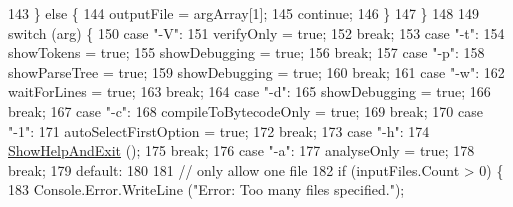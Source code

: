 \begin{DoxyCode}
143                     \} \textcolor{keywordflow}{else} \{
144                         outputFile = argArray[1];
145                         \textcolor{keywordflow}{continue};
146                     \}
147                 \}
148 
149                 \textcolor{keywordflow}{switch} (arg) \{
150                 \textcolor{keywordflow}{case} \textcolor{stringliteral}{"-V"}:
151                     verifyOnly = \textcolor{keyword}{true};
152                     \textcolor{keywordflow}{break};
153                 \textcolor{keywordflow}{case} \textcolor{stringliteral}{"-t"}:
154                     showTokens = \textcolor{keyword}{true};
155                     showDebugging = \textcolor{keyword}{true};
156                     \textcolor{keywordflow}{break};
157                 \textcolor{keywordflow}{case} \textcolor{stringliteral}{"-p"}:
158                     showParseTree = \textcolor{keyword}{true};
159                     showDebugging = \textcolor{keyword}{true};
160                     \textcolor{keywordflow}{break};
161                 \textcolor{keywordflow}{case} \textcolor{stringliteral}{"-w"}:
162                     waitForLines = \textcolor{keyword}{true};
163                     \textcolor{keywordflow}{break};
164                 \textcolor{keywordflow}{case} \textcolor{stringliteral}{"-d"}:
165                     showDebugging = \textcolor{keyword}{true};
166                     \textcolor{keywordflow}{break};
167                 \textcolor{keywordflow}{case} \textcolor{stringliteral}{"-c"}:
168                     compileToBytecodeOnly = \textcolor{keyword}{true};
169                     \textcolor{keywordflow}{break};
170                 \textcolor{keywordflow}{case} \textcolor{stringliteral}{"-1"}:
171                     autoSelectFirstOption = \textcolor{keyword}{true};
172                     \textcolor{keywordflow}{break};
173                 \textcolor{keywordflow}{case} \textcolor{stringliteral}{"-h"}:
174                     \hyperlink{a00106_a0ce7698dabf6d60f3cd33fe5d23c11b3}{ShowHelpAndExit} ();
175                     \textcolor{keywordflow}{break};
176                 \textcolor{keywordflow}{case} \textcolor{stringliteral}{"-a"}:
177                     analyseOnly = \textcolor{keyword}{true};
178                     \textcolor{keywordflow}{break};
179                 \textcolor{keywordflow}{default}:
180 
181                     \textcolor{comment}{// only allow one file}
182                     \textcolor{keywordflow}{if} (inputFiles.Count > 0) \{
183                         Console.Error.WriteLine (\textcolor{stringliteral}{"Error: Too many files specified."});

\end{DoxyCode}
